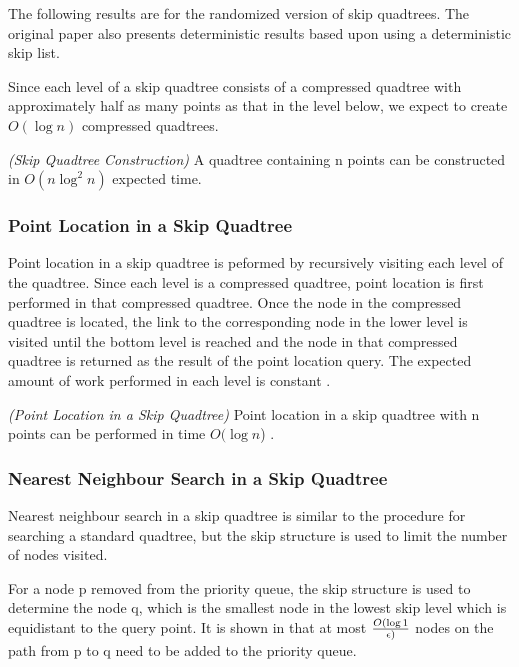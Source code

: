 \documentclass[mcs]{scsthesis}
\begin{document}
The following results are for the randomized version of skip quadtrees. The
original paper also presents deterministic results \cite{skiplist} based upon
using a deterministic skip list.

Since each level of a skip quadtree consists of a compressed quadtree with
approximately half as many points as that in the level below, we expect to
create \(O(\log n)\) compressed quadtrees.

\begin{thm} \emph{(Skip Quadtree Construction)}
A quadtree containing n points can be constructed in \(O(n \log^2 n)\)
expected time.
\end{thm}

\subsubsection{Point Location in a Skip Quadtree}

Point location in a skip quadtree is peformed by recursively visiting each level
of the quadtree. Since each level is a compressed quadtree, point location is
first performed in that compressed quadtree. Once the node in the compressed
quadtree is located, the link to the corresponding node in the lower level
is visited until the bottom level is reached and the node in that compressed
quadtree is returned as the result of the point location query. The expected
amount of work performed in each level is constant \cite{skipquadtree}.

\begin{thm} \emph{(Point Location in a Skip Quadtree)} 
Point location in a skip quadtree with n points can be performed in time
\(O(\log n\)) \cite{skipquadtree}. 
\end{thm}

\subsubsection{Nearest Neighbour Search in a Skip Quadtree}

Nearest neighbour search in a skip quadtree is similar to the procedure for
searching a standard quadtree, but the skip structure is used to limit
the number of nodes visited.

For a node p removed from the priority queue, the skip structure is used to
determine the node q, which is the smallest node in the lowest skip level
which is equidistant to the query point. It is shown in \cite{skipquadtree}
that at most \(O(\log 1 \over \epsilon)\) nodes on the path from p to q need
to be added to the priority queue.
\end{document}
